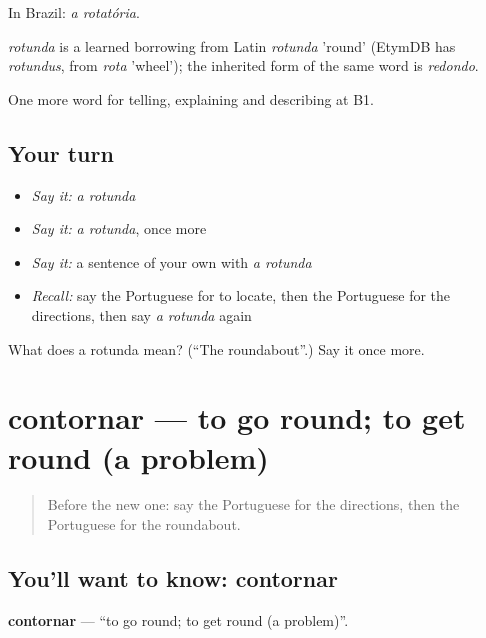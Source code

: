 In Brazil: \emph{a rotatória}.

\begin{cousinweb}
\emph{rotunda} is a learned borrowing from Latin \emph{rotunda} 'round' (EtymDB has \emph{rotundus}, from \emph{rota} 'wheel'); the inherited form of the same word is \emph{redondo}.
\end{cousinweb}

\begin{grammarlens}[title={What you've built}]
One more word for telling, explaining and describing at B1.
\end{grammarlens}

\subsection*{Your turn}
\begin{itemize}
\raggedright
  \item \emph{Say it:} \emph{a rotunda}
  \item \emph{Say it:} \emph{a rotunda}, once more
  \item \emph{Say it:} a sentence of your own with \emph{a rotunda}
  \item \emph{Recall:} say the Portuguese for to locate, then the Portuguese for the directions, then say \emph{a rotunda} again
\end{itemize}

\begin{tcolorbox}[breakable,colback=teal!4,colframe=teal!35!black,title={Before you move on}]
What does a rotunda mean? (\textquotedblleft{}The roundabout\textquotedblright{}.) Say it once more.
\end{tcolorbox}
\section[contornar]{contornar — to go round; to get round (a problem)}

\label{lesson:PT-C436-contornar}



\begin{quote}
Before the new one: say the Portuguese for the directions, then the Portuguese for the roundabout.
\end{quote}

\subsection*{You'll want to know: contornar}
\textbf{contornar} — \textquotedblleft{}to go round; to get round (a problem)\textquotedblright{}.

